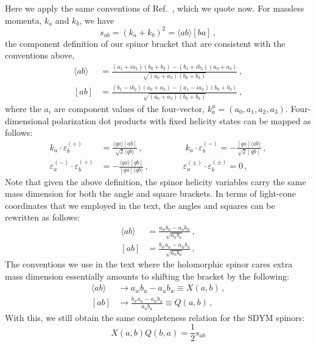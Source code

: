 \documentclass[11pt,letter]{article}
\def\be{\begin{equation}}
\def\ee{\end{equation}}
\begin{document}
Here we apply the same conventions of Ref.~\cite{jjmcTASI2014}, which we quote now. For massless momenta, $k_a$ and $k_b$, we have 
\begin{equation}
s_{ab} = (k_a+k_b)^2= \langle ab \rangle[ba]\,,
\end{equation}
the component definition of our spinor bracket that are consistent with the conventions above,
\begin{align}
\langle ab \rangle &= \frac{(a_1 + i a_2)(b_0+b_3)-(b_1 + i b_2)(a_0+a_3)}{\sqrt{(a_0+a_3)(b_0+b_3)}}\,,
\\
[ab] &= \frac{(b_1 - i b_2)(a_0+a_3)-(a_1 - i a_2)(b_0+b_3)}{\sqrt{(a_0+a_3)(b_0+b_3)}}\,,
\end{align}
where the $a_i$ are component values of the four-vector, $k^\mu_a = (a_0,a_1,a_2,a_3)$. Four-dimensional polarization dot products with fixed helicity states can be mapped as follows:
\begin{equation}\label{eq:4DPols}
\begin{aligned}
k_a \cdot \varepsilon_b^{(+)} &= \frac{\langle q a \rangle[ab]}{\sqrt{2}\langle q b\rangle}\,,
\qquad\quad \qquad
k_a \cdot \varepsilon_b^{(-)} = -\frac{[qa]\langle ab\rangle}{\sqrt{2}[qb]}\,,
\\
\varepsilon_a^{(-)}\cdot \varepsilon_b^{(+)} &= - \frac{\langle q a\rangle [qb]}{ [qa]\langle q b\rangle} \,,
\qquad \qquad
\varepsilon_a^{(\pm)}\cdot \varepsilon_b^{(\pm)} = 0 \,,
\end{aligned}
\end{equation}
Note that given the above definition, the spinor helicity variables carry the same mass dimension for both the angle and square brackets. In terms of light-cone coordinates that we employed in the text, the angles and squares can be rewritten as follows:
\begin{align}
\langle ab \rangle &= \frac{a_w b_u-a_u b_w}{\sqrt{a_ub_u}}\,,
\\
[ab] &= \frac{b_{\bar{w}}a_u-a_{\bar{w}}b_u}{\sqrt{a_ub_u}}\,,
\end{align}
The conventions we use in the text where the holomorphic spinor cares extra mass dimension essentially amounts to shifting the bracket by the following:
\begin{align}
\langle ab \rangle &\rightarrow a_w b_u-a_u b_w \equiv X(a,b)\,,
\\
[ab] &\rightarrow \frac{b_{\bar{w}}a_u-a_{\bar{w}}b_u}{a_ub_u}\equiv Q(a,b)\,,
\end{align}
With this, we still obtain the same completeness relation for the SDYM spinors:
\be
X(a,b)Q(b,a) = \frac{1}{2}s_{ab}
\ee
\end{document}

